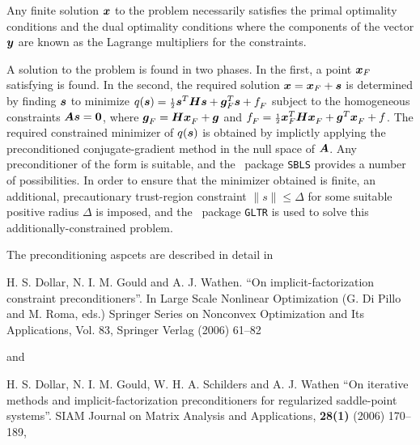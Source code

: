 \documentclass{galahad}
\begin{document}

\galmethod
Any finite solution ${\bm{x}}$ to the problem necessarily satisfies 
the primal optimality conditions
and the dual optimality conditions
where the components of the vector ${\bm{y}}$ are 
known as the Lagrange multipliers for the constraints.

A solution to the problem is found in two phases.
In the first, a point ${\bm{x}}_F$ satisfying  is found.
In the second, the required solution ${\bm{x}} = {\bm{x}}_F + {\bm{s}}$
is determined by finding ${\bm{s}}$ to minimize 
$q({\bm{s}}) = {\scriptstyle \frac{1}{2}} {\bm{s}}^T {\bm{H}} {\bm{s}} + {\bm{g}}_F^T {\bm{s}} + f_F^{}$
subject to the homogeneous constraints ${\bm{A}} {\bm{s}} = {\bm{0}}$,
where ${\bm{g}}_F^{} = {\bm{H}} {\bm{x}}_F^{} + {\bm{g}}$ and 
$f_F^{} = {\scriptstyle \frac{1}{2}} {\bm{x}}_F^T {\bm{H}} {\bm{x}}_F^{} + {\bm{g}}^T {\bm{x}}_F^{} + f$.
The required constrained minimizer of $q({\bm{s}})$ is obtained
by implictly applying the preconditioned conjugate-gradient method
in the null space of ${\bm{A}}$. Any preconditioner of the form
is suitable, and the \galahad\ package {\tt SBLS}
provides a number of possibilities. In order to ensure that the
minimizer obtained is finite, an additional, precautionary trust-region
constraint $\|s\| \leq \Delta$ for some suitable positive radius 
$\Delta$ is imposed, and the \galahad\ package {\tt GLTR} is used to solve 
this additionally-constrained problem.
\vspace*{1mm}

\galreferences
\vspace*{1mm}

\noindent
The preconditioning aspcets are described in detail in
\vspace*{1mm}

\noindent
H. S. Dollar, N. I. M. Gould and A. J. Wathen.
``On implicit-factorization constraint preconditioners''.
In  Large Scale Nonlinear Optimization (G. Di Pillo and M. Roma, eds.)
Springer Series on Nonconvex Optimization and Its Applications, Vol. 83,
Springer Verlag (2006) 61--82

\noindent
and

\noindent
H. S. Dollar, N. I. M. Gould, W. H. A. Schilders and A. J. Wathen
``On iterative methods and implicit-factorization preconditioners for 
regularized saddle-point systems''.
SIAM Journal on Matrix Analysis and Applications, {\bf 28(1)} (2006) 170--189,
\end{document}
